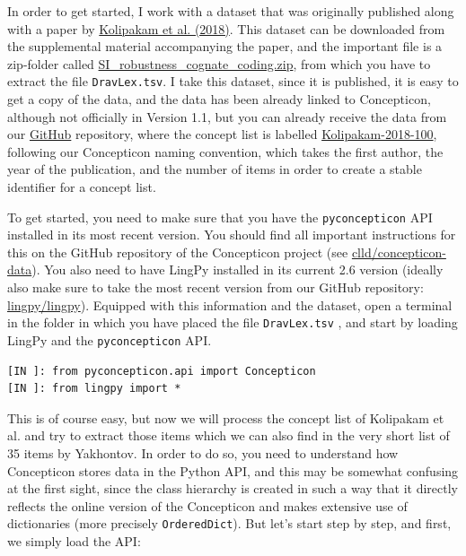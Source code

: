 \documentclass[
  a4paper,
  14pt,
  oneside,
  tablecaptionabove
]{scrbook}
\newcommand{\passthrough}[1]{#1}
\begin{document}
In order to get started, I work with a dataset that was originally
published along with a paper by
\href{http://bibliography.lingpy.org?key=Kolipakam2018}{Kolipakam et al.
(2018)}. This dataset can be downloaded from the supplemental material
accompanying the paper, and the important file is a zip-folder called
\href{http://rsos.royalsocietypublishing.org/highwire/filestream/18890/field_highwire_adjunct_files/3/rsos171504supp4.zip}{SI\_robustness\_cognate\_coding.zip},
from which you have to extract the file
\passthrough{\lstinline!DravLex.tsv!}. I take this dataset, since it is
published, it is easy to get a copy of the data, and the data has been
already linked to Concepticon, although not officially in Version 1.1,
but you can already receive the data from our
\href{https://github.com/clld/concepticon-data}{GitHub} repository,
where the concept list is labelled
\href{https://github.com/clld/concepticon-data/blob/master/concepticondata/conceptlists/Kolipakam-2018-100.tsv}{Kolipakam-2018-100},
following our Concepticon naming convention, which takes the first
author, the year of the publication, and the number of items in order to
create a stable identifier for a concept list.

To get started, you need to make sure that you have the
\lstinline!pyconcepticon! API installed in its most recent version. You
should find all important instructions for this on the GitHub repository
of the Concepticon project (see
\href{https://github.com/clld/concepticon-data}{clld/concepticon-data}). You also need to have LingPy installed in its current 2.6 version
(ideally also make sure to take the most recent version from our GitHub
repository: \href{https://github.com/lingpy/lingpy}{lingpy/lingpy}).
Equipped with this information and the dataset, open a terminal in the
folder in which you have placed the file \lstinline!DravLex.tsv! , and
start by loading LingPy and the \lstinline!pyconcepticon! API.

\begin{lstlisting}
[IN ]: from pyconcepticon.api import Concepticon
[IN ]: from lingpy import *
\end{lstlisting}

This is of course easy, but now we will process the concept list of
Kolipakam et al. and try to extract those items which we can also find
in the very short list of 35 items by Yakhontov. In order to do so, you
need to understand how Concepticon stores data in the Python API, and
this may be somewhat confusing at the first sight, since the class
hierarchy is created in such a way that it directly reflects the online
version of the Concepticon and makes extensive use of dictionaries (more
precisely \lstinline!OrderedDict!). But let's start step by step, and
first, we simply load the API:
\end{document}
